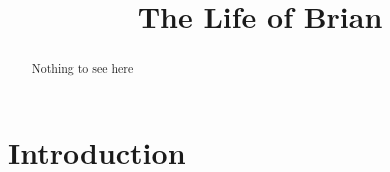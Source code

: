 \documentclass{preamble}
\title{The Life of Brian}
\begin{document}
\maketitle

\begin{abstract}
    Nothing to see here
\end{abstract}

\section{Introduction}

\printbibliography{}
\end{document}
